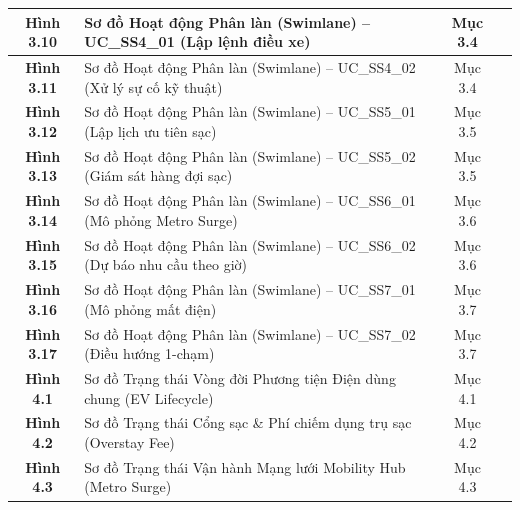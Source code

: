 \documentclass[12pt,a4paper]{article}
\begin{document}
\begin{longtable}{|c|p{8.5cm}|c|c|}
    \hline
    \textbf{Hình 3.10} & Sơ đồ Hoạt động Phân làn (Swimlane) -- UC\_SS4\_01 (Lập lệnh điều xe) & Mục 3.4 & \pageref{fig:act-ss4-01} \\
    \hline
    \textbf{Hình 3.11} & Sơ đồ Hoạt động Phân làn (Swimlane) -- UC\_SS4\_02 (Xử lý sự cố kỹ thuật) & Mục 3.4 & \pageref{fig:act-ss4-02} \\
    \hline
    \textbf{Hình 3.12} & Sơ đồ Hoạt động Phân làn (Swimlane) -- UC\_SS5\_01 (Lập lịch ưu tiên sạc) & Mục 3.5 & \pageref{fig:act-ss5-01} \\
    \hline
    \textbf{Hình 3.13} & Sơ đồ Hoạt động Phân làn (Swimlane) -- UC\_SS5\_02 (Giám sát hàng đợi sạc) & Mục 3.5 & \pageref{fig:act-ss5-02} \\
    \hline
    \textbf{Hình 3.14} & Sơ đồ Hoạt động Phân làn (Swimlane) -- UC\_SS6\_01 (Mô phỏng Metro Surge) & Mục 3.6 & \pageref{fig:act-ss6-01} \\
    \hline
    \textbf{Hình 3.15} & Sơ đồ Hoạt động Phân làn (Swimlane) -- UC\_SS6\_02 (Dự báo nhu cầu theo giờ) & Mục 3.6 & \pageref{fig:act-ss6-02} \\
    \hline
    \textbf{Hình 3.16} & Sơ đồ Hoạt động Phân làn (Swimlane) -- UC\_SS7\_01 (Mô phỏng mất điện) & Mục 3.7 & \pageref{fig:act-ss7-01} \\
    \hline
    \textbf{Hình 3.17} & Sơ đồ Hoạt động Phân làn (Swimlane) -- UC\_SS7\_02 (Điều hướng 1-chạm) & Mục 3.7 & \pageref{fig:act-ss7-02} \\
    \hline
    \textbf{Hình 4.1} & Sơ đồ Trạng thái Vòng đời Phương tiện Điện dùng chung (EV Lifecycle) & Mục 4.1 & \pageref{fig:state-ev} \\
    \hline
    \textbf{Hình 4.2} & Sơ đồ Trạng thái Cổng sạc \& Phí chiếm dụng trụ sạc (Overstay Fee) & Mục 4.2 & \pageref{fig:state-charging} \\
    \hline
    \textbf{Hình 4.3} & Sơ đồ Trạng thái Vận hành Mạng lưới Mobility Hub (Metro Surge) & Mục 4.3 & \pageref{fig:state-hub} \\
    \hline
\end{longtable}

\vspace{0.4cm}
\end{document}
